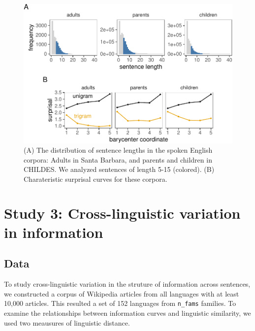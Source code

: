 \documentclass[10pt, letterpaper]{article}
\newenvironment{CodeChunk}{}{}
\begin{document}
\begin{CodeChunk}
\begin{figure}[tb]

{\centering \includegraphics{figs/spoken_figs-1} 

}

\caption[(A) The distribution of sentence lengths in the spoken English corpora]{(A) The distribution of sentence lengths in the spoken English corpora: Adults in Santa Barbara, and parents and children in CHILDES. We analyzed sentences of length 5-15 (colored). (B) Charateristic surprisal curves for these corpora.}\label{fig:spoken_figs}
\end{figure}
\end{CodeChunk}

\hypertarget{study-3-cross-linguistic-variation-in-information}{%
\section{Study 3: Cross-linguistic variation in
information}\label{study-3-cross-linguistic-variation-in-information}}

\hypertarget{data-2}{%
\subsection{Data}\label{data-2}}

To study cross-linguistic variation in the struture of information
across sentences, we constructed a corpus of Wikipedia articles from all
languages with at least 10,000 articles. This resulted a set of 152
languages from \texttt{n\_fams} families. To examine the relationships
between information curves and linguistic similarity, we used two
meausures of linguistic distance.
\end{document}
